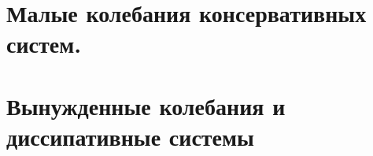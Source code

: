 


\section{Малые колебания консервативных систем.}

% 

\section{Вынужденные колебания и диссипативные системы}



